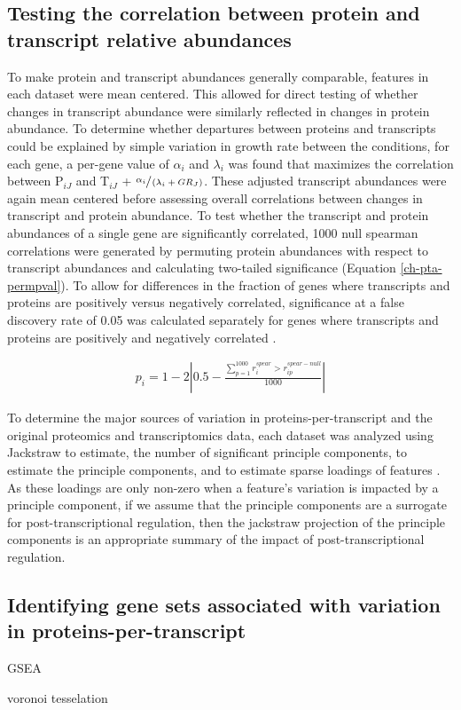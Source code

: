 \subsection{Testing the correlation between protein and transcript relative abundances}

To make protein and transcript abundances generally comparable, features in each dataset were mean centered. This allowed for direct testing of whether changes in transcript abundance were similarly reflected in changes in protein abundance.  To determine whether departures between proteins and transcripts could be explained by simple variation in growth rate between the conditions, for each gene, a per-gene value of $\alpha_{i}$ and $\lambda_{i}$ was found that maximizes the correlation between P$_{iJ}$ and T$_{iJ}$ + $\sfrac{\alpha_{i}}{\left(\lambda_{i} + GR_{J}\right)}$.  These adjusted transcript abundances were again mean centered before assessing overall correlations between changes in transcript and protein abundance. To test whether the transcript and protein abundances of a single gene are significantly correlated, 1000 null spearman correlations were generated by permuting protein abundances with respect to transcript abundances and calculating two-tailed significance (Equation \ref{ch-pta-permpval}). To allow for differences in the fraction of genes where transcripts and proteins are positively versus negatively correlated, significance at a false discovery rate of 0.05 was calculated separately for genes where transcripts and proteins are positively and negatively correlated \cite{Storey:2003cj}.

\begin{align}
p_{i} = 1 - 2\left|0.5 - \frac{\sum_{p = 1}^{1000}r^{spear}_{i} > r_{ip}^{spear-null}}{1000}\label{ch-pta-permpval}\right|
\end{align}

To determine the major sources of variation in proteins-per-transcript and the original proteomics and transcriptomics data, each dataset was analyzed using Jackstraw to estimate, the number of significant principle components, to estimate the principle components, and to estimate sparse loadings of features \cite{Chung:2015bq}. As these loadings are only non-zero when a feature's variation is impacted by a principle component, if we assume that the principle components are a surrogate for post-transcriptional regulation, then the jackstraw projection of the principle components is an appropriate summary of the impact of post-transcriptional regulation.

\subsection{Identifying gene sets associated with variation in proteins-per-transcript}

GSEA

voronoi tesselation